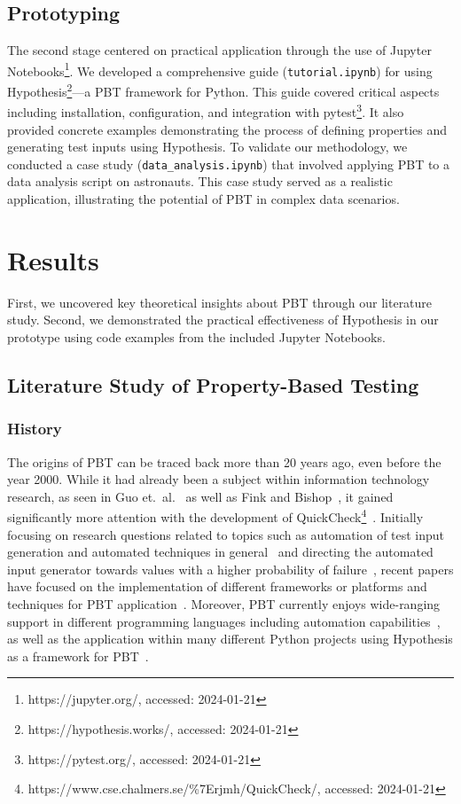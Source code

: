 \documentclass[runningheads]{llncs}
\begin{document}
\subsection{Prototyping}
The second stage centered on practical application through the use of Jupyter Notebooks\footnote{https://jupyter.org/, accessed: 2024-01-21}. We developed a comprehensive guide (\texttt{tutorial.ipynb}) for using Hypothesis\footnote{https://hypothesis.works/, accessed: 2024-01-21}---a PBT framework for Python. This guide covered critical aspects including installation, configuration, and integration with pytest\footnote{https://pytest.org/, accessed: 2024-01-21}. It also provided concrete examples demonstrating the process of defining properties and generating test inputs using Hypothesis. To validate our methodology, we conducted a case study (\texttt{data\_analysis.ipynb}) that involved applying PBT to a data analysis script on astronauts. This case study served as a realistic application, illustrating the potential of PBT in complex data scenarios.

\section{Results}
First, we uncovered key theoretical insights about PBT through our literature study. Second, we demonstrated the practical effectiveness of Hypothesis in our prototype using code examples from the included Jupyter Notebooks.

\subsection{Literature Study of Property-Based Testing}
\subsubsection{History}
The origins of PBT can be traced back more than 20 years ago, even before the year 2000. While it had already been a subject within information technology research, as seen in Guo et.~al.~\cite{Guo1999} as well as Fink and Bishop~\cite{Fink1997}, it gained significantly more attention with the development of QuickCheck\footnote{https://www.cse.chalmers.se/\%7Erjmh/QuickCheck/, accessed: 2024-01-21}~\cite{Shi2023,Guo1999,Fink1997,MacIver2019,Honarvar2020}. Initially focusing on research questions related to topics such as automation of test input generation and automated techniques in general~\cite{Fink1997} and directing the automated input generator towards values with a higher probability of failure~\cite{Loescher2017}, recent papers have focused on the implementation of different frameworks or platforms and techniques for PBT application~\cite{Padhye2019,Honarvar2020,Shi2023,Corgozinho2023}. Moreover, PBT currently enjoys wide-ranging support in different programming languages including automation capabilities~\cite{Chen2022,Padhye2019,Honarvar2020,ElazarMittelman2023,Shi2023}, as well as the application within many different Python projects using Hypothesis as a framework for PBT~\cite{Corgozinho2023}.
\end{document}
